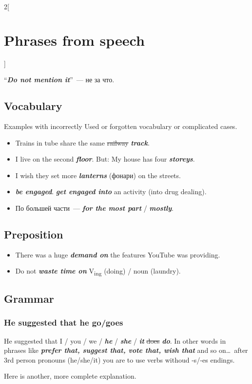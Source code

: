 \documentclass[10pt,a4paper]{article}
\newlength{\OriginalParIndent}
\newcommand\ex[1]{\textit{\textbf{{#1}}}}           %
\newenvironment{ItemizeWithOrigParIndent}
    {\begin{itemize}[leftmargin=\OriginalParIndent]}
    {\end{itemize}}
\begin{document}
\begin{multicols}{2}[\section{Phrases from speech}]
\begin{ItemizeWithOrigParIndent}
   ``\ex{Do not mention it}''~--- не за что.

\end{ItemizeWithOrigParIndent}

\subsection{Vocabulary}
Examples with incorrectly Used or forgotten vocabulary or complicated cases.

\begin{ItemizeWithOrigParIndent}
   \item Trains in tube share the same \sout{railway} \ex{track}.
   \item I live on the second \ex{floor}. But: My house has four \ex{storeys}.
   \item I wish they set more \ex{lanterns} (фонари) on the streets.
   \item \ex{be engaged}. \ex{get engaged into} an activity (into drug dealing).
   \item По большей части~--- \ex{for the most part} / \ex{mostly}.
\end{ItemizeWithOrigParIndent}


\subsection{Preposition}
\begin{ItemizeWithOrigParIndent}
   \item There was a huge \ex{demand on} the features YouTube was providing.
   \item Do not \ex{waste time on} V\textsubscript{ing} (doing) / noun (laundry).
\end{ItemizeWithOrigParIndent}


\subsection{Grammar}
\subsubsection{He suggested that he go/goes}
   He suggested that I / you / we / \ex{he} / \ex{she} / \ex{it} \sout{does} \ex{do}.
   In other words in phrases like \ex{prefer that, suggest that, vote that, wish that} and
   so on\dots\ after 3rd person pronouns (he/she/it) you are to use verbs withoud -s/-es endings.

   Here is another, more complete explanation.


\end{multicols}
\end{document}
